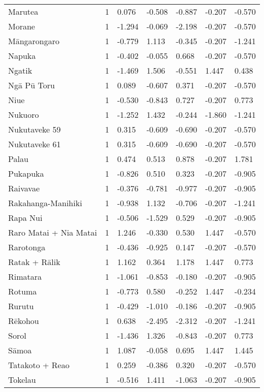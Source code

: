 \begin{longtable}{p{4.5cm}p{1.4cm}p{1.4cm}p{1.4cm}p{1.4cm}p{1.7cm}p{1.7cm}}
  Marutea & 1 & 0.076 & -0.508 & -0.887 & -0.207 & -0.570 \\ 
  Morane & 1 & -1.294 & -0.069 & -2.198 & -0.207 & -0.570 \\ 
  Māngarongaro & 1 & -0.779 & 1.113 & -0.345 & -0.207 & -1.241 \\ 
  Napuka & 1 & -0.402 & -0.055 & 0.668 & -0.207 & -0.570 \\ 
  Ngatik & 1 & -1.469 & 1.506 & -0.551 & 1.447 & 0.438 \\ 
  Ngā Pū Toru & 1 & 0.089 & -0.607 & 0.371 & -0.207 & -0.570 \\ 
  Niue & 1 & -0.530 & -0.843 & 0.727 & -0.207 & 0.773 \\ 
  Nukuoro & 1 & -1.252 & 1.432 & -0.244 & -1.860 & -1.241 \\ 
  Nukutaveke 59 & 1 & 0.315 & -0.609 & -0.690 & -0.207 & -0.570 \\ 
  Nukutaveke 61 & 1 & 0.315 & -0.609 & -0.690 & -0.207 & -0.570 \\ 
  Palau & 1 & 0.474 & 0.513 & 0.878 & -0.207 & 1.781 \\ 
  Pukapuka & 1 & -0.826 & 0.510 & 0.323 & -0.207 & -0.905 \\ 
  Raivavae & 1 & -0.376 & -0.781 & -0.977 & -0.207 & -0.905 \\ 
  Rakahanga-Manihiki & 1 & -0.938 & 1.132 & -0.706 & -0.207 & -1.241 \\ 
  Rapa Nui & 1 & -0.506 & -1.529 & 0.529 & -0.207 & -0.905 \\ 
  Raro Matai + Nia Matai & 1 & 1.246 & -0.330 & 0.530 & 1.447 & -0.570 \\ 
  Rarotonga & 1 & -0.436 & -0.925 & 0.147 & -0.207 & -0.570 \\ 
  Ratak + Rālik & 1 & 1.162 & 0.364 & 1.178 & 1.447 & 0.773 \\ 
  Rimatara & 1 & -1.061 & -0.853 & -0.180 & -0.207 & -0.905 \\ 
  Rotuma & 1 & -0.773 & 0.580 & -0.252 & 1.447 & -0.234 \\ 
  Rurutu & 1 & -0.429 & -1.010 & -0.186 & -0.207 & -0.905 \\ 
  Rēkohou & 1 & 0.638 & -2.495 & -2.312 & -0.207 & -1.241 \\ 
  Sorol & 1 & -1.436 & 1.326 & -0.843 & -0.207 & 0.773 \\ 
  Sāmoa & 1 & 1.087 & -0.058 & 0.695 & 1.447 & 1.445 \\ 
  Tatakoto + Reao & 1 & 0.259 & -0.386 & 0.320 & -0.207 & -0.570 \\ 
  Tokelau & 1 & -0.516 & 1.411 & -1.063 & -0.207 & -0.905 \\ 

\end{longtable}
